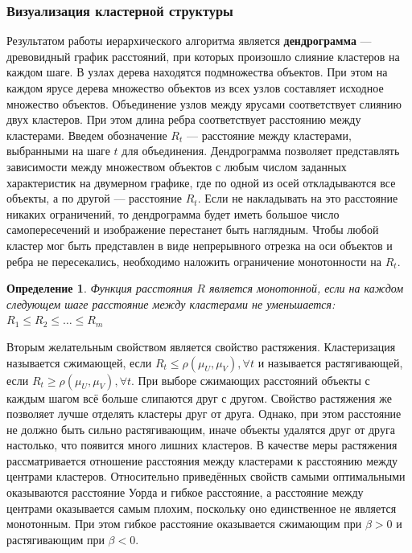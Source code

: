 \documentclass[10pt]{article}
\renewcommand{\leq}{\leqslant}
\renewcommand{\geq}{\geqslant}
\newtheorem{definition}{Определение}
\begin{document}
\subsubsection*{Визуализация кластерной структуры}
Результатом работы иерархического алгоритма является \textbf{дендрограмма} 
--- древовидный график расстояний, при которых произошло слияние кластеров на каждом шаге.
В узлах дерева находятся подмножества объектов. При этом на каждом ярусе дерева множество объектов из всех узлов составляет исходное множество объектов. Объединение узлов между ярусами соответствует слиянию двух кластеров. При этом длина ребра соответствует расстоянию между кластерами. Введем обозначение $R_t$ --- расстояние между кластерами, выбранными на шаге $t$ для объединения. Дендрограмма позволяет представлять зависимости между множеством объектов с любым числом заданных характеристик на двумерном графике, где по одной из осей откладываются все объекты, а по другой --- расстояние $R_t$. Если не накладывать на это расстояние никаких ограничений, то дендрограмма будет иметь большое число самопересечений и изображение перестанет быть наглядным. Чтобы любой кластер мог быть представлен в виде непрерывного отрезка на оси объектов и ребра не пересекались, необходимо наложить ограничение монотонности на $R_t$.

\begin{definition}
	Функция расстояния $R$ является монотонной, если на каждом следующем шаге расстояние между кластерами не уменьшается: $R_1 \leq R_2 \leq \dots \leq R_m$
\end{definition}

Вторым желательным свойством является свойство растяжения. Кластеризация называется сжимающей, если $R_t \leq \rho(\mu_U, \mu_V), \forall t$ и называется растягивающей, 
если $R_t \geq \rho(\mu_U, \mu_V), \forall t$.
При выборе сжимающих расстояний объекты с каждым шагом всё больше слипаются друг с другом.
Свойство растяжения же позволяет лучше отделять кластеры друг от друга. 
Однако, при этом расстояние не должно быть сильно растягивающим, иначе объекты удалятся друг от друга настолько, что появится много лишних кластеров. 
В качестве меры растяжения рассматривается отношение расстояния между кластерами к расстоянию между центрами кластеров. 
Относительно приведённых свойств самыми оптимальными оказываются расстояние Уорда и гибкое расстояние, 
а расстояние между центрами оказывается самым плохим, поскольку оно единственное не является монотонным. 
При этом гибкое расстояние оказывается сжимающим при $\beta >0$ и растягивающим при $\beta <0$. 
\end{document}
